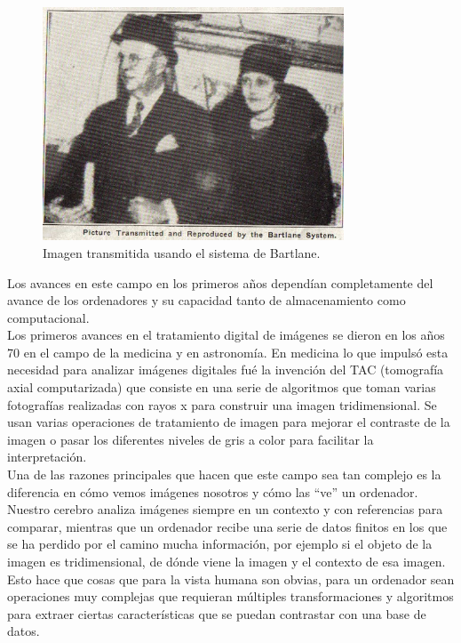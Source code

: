 \begin{figure}[h]
\centering
\includegraphics[width=0.8\textwidth]{imagenes/1digital}
\caption{Imagen transmitida usando el sistema de Bartlane.}
\label{1digital}
\end{figure}

Los avances en este campo en los primeros años dependían completamente del avance de los ordenadores y su capacidad tanto de almacenamiento como computacional.\\

Los primeros avances en el tratamiento digital de imágenes se dieron en los años 70 en el campo de la medicina y en astronomía. En medicina lo que impulsó esta necesidad para analizar imágenes digitales fué la invención del TAC (tomografía axial computarizada) que consiste en una serie de algoritmos que toman varias fotografías realizadas con rayos x para construir una imagen tridimensional. Se usan varias operaciones de tratamiento de imagen para mejorar el contraste de la imagen o pasar los diferentes niveles de gris a color para facilitar la interpretación.\\

Una de las razones principales que hacen que este campo sea tan complejo es la diferencia en cómo vemos imágenes nosotros y cómo las ``ve'' un ordenador. Nuestro cerebro analiza imágenes siempre en un contexto y con referencias para comparar, mientras que un ordenador recibe una serie de datos finitos en los que se ha perdido por el camino mucha información, por ejemplo si el objeto de la imagen es tridimensional, de dónde viene la imagen y el contexto de esa imagen. Esto hace que cosas que para la vista humana son obvias, para un ordenador sean operaciones muy complejas que requieran múltiples transformaciones y algoritmos para extraer ciertas características que se puedan contrastar con una base de datos.\\

